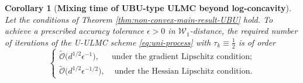 \documentclass[12pt]{article}
\newenvironment{redtext}
  {\color{black}\ignorespaces}
  {\ignorespacesafterend}
\numberwithin{equation}{section}
\newtheorem{cor}{Corollary}[section]
\begin{document}
\begin{redtext}
\begin{cor}[\textbf{Mixing time of UBU-type ULMC beyond log-concavity}]
\label{cor:mixing-time-non-convex-UBU}
Let the conditions of Theorem
\ref{thm:non-convex-main-result-UBU} hold.
To achieve a prescribed accuracy tolerance
\(\epsilon>0\) in \(\mathcal W_1\)-distance, the required
number of iterations of the U-ULMC scheme
\eqref{eq:uni-process} with \(\tau_k\equiv\frac12\) is of order
\[
\begin{cases}
\widetilde{\mathcal O}
\bigl(d^{1/2}\epsilon^{-1}\bigr),
& \text{under the gradient Lipschitz condition};\\[1mm]
\widetilde{\mathcal O}
\bigl(d^{1/2}\epsilon^{-1/2}\bigr),
&\text{ under the Hessian Lipschitz condition.}
\end{cases}
\]
\end{cor}


\end{redtext}
\end{document}
